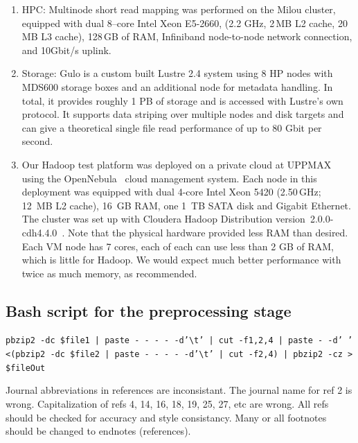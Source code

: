 \documentclass[11pt, oneside]{article}   	%
\newcommand{\COMMENT}[1]{{\color{red} #1 }}
\begin{document}
\begin{enumerate}

\item 
HPC:
Multinode short read mapping was performed on the Milou cluster\cite{milouCluster}, equipped with dual 8--core Intel Xeon E5-2660, (2.2 GHz, 2\,MB L2 cache, 20\,MB L3 cache), 128\,GB of RAM, Infiniband node-to-node network connection, and 10Gbit/s uplink.

\item Storage: 
Gulo\cite{gulo} is a custom built Lustre 2.4 system using 8 HP nodes with MDS600 storage boxes and an additional node for metadata handling. In total, it provides roughly 1 PB of storage and is accessed with Lustre's own protocol. It supports data striping over multiple nodes and disk targets and can give a theoretical single file read performance of up to 80 Gbit per second.

\item Our Hadoop test platform was deployed on a private cloud at UPPMAX using the OpenNebula~\cite{opennebula} cloud management system. Each node in this deployment was equipped with dual 4-core Intel Xeon 5420 (2.50\,GHz; 12~MB L2 cache), 16~GB RAM, one 1~TB SATA disk and Gigabit Ethernet. The cluster was set up with Cloudera Hadoop Distribution version~2.0.0-cdh4.4.0~\cite{cloudera}.
Note that the physical hardware provided less RAM than desired. Each VM node has 7 cores, each of each can use less than 2 GB of RAM, which is little for Hadoop. We would expect much better performance with twice as much memory, as recommended.
\end{enumerate}


\subsection{Bash script for the preprocessing stage}

\texttt {pbzip2 -dc  \${file1} | paste - - - - -d'\textbackslash t' | cut -f1,2,4 | paste - -d' ' <(pbzip2 -dc  \${file2} | paste - - - - -d'\textbackslash t' | cut -f2,4) | pbzip2 -cz > \${fileOut}}


\COMMENT{Journal abbreviations in references are inconsistant. The journal name for ref 2 is wrong. Capitalization of refs 4, 14, 16, 18, 19, 25, 27, etc are wrong. All refs should be checked for accuracy and style consistancy. Many or all footnotes should be changed to endnotes (references).}




\end{document}
